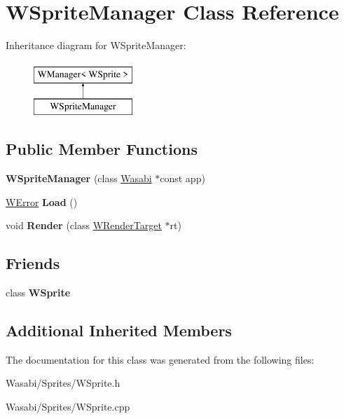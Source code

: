\hypertarget{class_w_sprite_manager}{}\section{W\+Sprite\+Manager Class Reference}
\label{class_w_sprite_manager}
Inheritance diagram for W\+Sprite\+Manager\+:\begin{figure}[H]
\begin{center}
\leavevmode
\includegraphics[height=2.000000cm]{class_w_sprite_manager}
\end{center}
\end{figure}
\subsection*{Public Member Functions}
\begin{DoxyCompactItemize}
\item 
{\bfseries W\+Sprite\+Manager} (class \hyperlink{class_wasabi}{Wasabi} $\ast$const app)\hypertarget{class_w_sprite_manager_a762dd51a3d596207579f511b43dfb8cf}{}\label{class_w_sprite_manager_a762dd51a3d596207579f511b43dfb8cf}

\item 
\hyperlink{class_w_error}{W\+Error} {\bfseries Load} ()\hypertarget{class_w_sprite_manager_ac0bb8e9aab6f4afef637f9efff9287eb}{}\label{class_w_sprite_manager_ac0bb8e9aab6f4afef637f9efff9287eb}

\item 
void {\bfseries Render} (class \hyperlink{class_w_render_target}{W\+Render\+Target} $\ast$rt)\hypertarget{class_w_sprite_manager_a1b8aa56289501f09f799b915fa747f32}{}\label{class_w_sprite_manager_a1b8aa56289501f09f799b915fa747f32}

\end{DoxyCompactItemize}
\subsection*{Friends}
\begin{DoxyCompactItemize}
\item 
class {\bfseries W\+Sprite}\hypertarget{class_w_sprite_manager_a686a94e2d57cd16a5045d84773fec226}{}\label{class_w_sprite_manager_a686a94e2d57cd16a5045d84773fec226}

\end{DoxyCompactItemize}
\subsection*{Additional Inherited Members}


The documentation for this class was generated from the following files\+:\begin{DoxyCompactItemize}
\item 
Wasabi/\+Sprites/W\+Sprite.\+h\item 
Wasabi/\+Sprites/W\+Sprite.\+cpp\end{DoxyCompactItemize}
